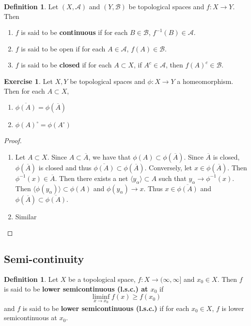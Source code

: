 \documentclass[12pt]{amsart}
\theoremstyle{definition}
\newtheorem{defn}[definition]{Definition}
\newtheorem{ex}[definition]{Exercise}
\newcommand{\al}{\alpha}
\newcommand{\MA}{\mathcal{A}}
\newcommand{\MB}{\mathcal{B}}
\renewcommand{\r}{\rangle}
\renewcommand{\l}{\langle}
\newcommand{\Ru}{(\infty, \infty]}
\begin{document}
	\begin{defn}
		Let $(X,\MA)$ and $(Y,\MB)$ be topological spaces and $f:X \rightarrow Y$. Then 
		\begin{enumerate}
			\item $f$ is said to be \textbf{continuous} if for each $B \in \MB$, $f^{-1}(B) \in \MA$.
			\item $f$ is said to be open if for each $A \in \MA$, $f(A) \in \MB$.
			\item $f$ is said to be \textbf{closed} if for each $A \subset X$, if $A^c \in \MA$, then $f(A)^c \in \MB$.
		\end{enumerate}
	\end{defn}
	
	\begin{ex}
		Let $X, Y$ be topological spaces and $\phi: X \rightarrow Y$ a homeomorphism. Then for each $A \subset X$, 
		\begin{enumerate}
			\item $\overline{\phi(A)} = \phi(\overline{A})$  \item $\phi(A)^{\circ} = \phi(A^{\circ})$  
		\end{enumerate} 
	\end{ex}
	
	\begin{proof}\
		\begin{enumerate}
			\item Let $A \subset X$. Since $A \subset \overline{A}$, we have that $\phi(A) \subset \phi(\overline{A})$. Since $\overline{A}$ is closed, $\phi(\overline{A})$ is closed and thus $\overline{\phi(A)} \subset \phi(\overline{A})$. Conversely, let $x \in \phi(\overline{A})$. Then $\phi^{-1}(x) \in \overline{A}$. Then there exists a net $\l y_{\al}\r \subset A$ such that $y_{\al} \rightarrow \phi^{-1}(x)$. Then $\l \phi(y_{\al}) \r \subset \phi(A)$ and $\phi(y_{\al}) \rightarrow x$. Thus $x \in \overline{\phi(A)}$ and $\phi(\overline{A}) \subset \overline{\phi(A)}$.
			\item Similar
		\end{enumerate} 
	\end{proof}
	
	
	
	\subsection{Semi-continuity}
	
	\begin{defn}
	Let $X$ be a topological space, $f: X \rightarrow \Ru$ and $x_0 \in X$. Then $f$ is said to be \textbf{lower semicontinuous (l.s.c.) at $x_0$} if $$\liminf_{x \rightarrow x_0}f(x) \geq f(x_0)$$ and $f$ is said to be \textbf{lower semicontinuous (l.s.c.)} if for each $x_0 \in X$, $f$ is lower semicontinuous at $x_0$. 
	\end{defn}
	
\end{document}
